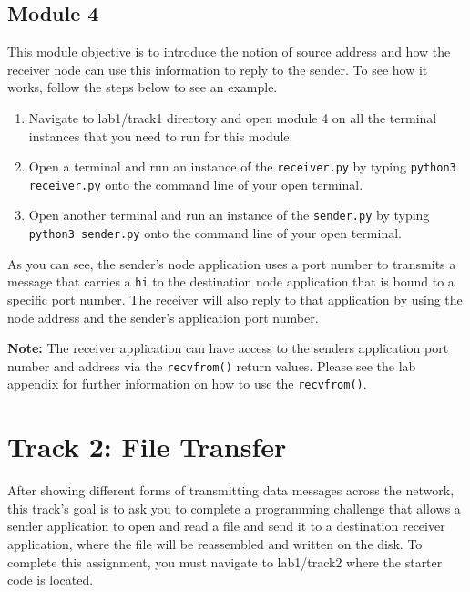 \documentclass[11pt]{article}
\begin{document}


\subsection{Module 4}
\label{subsec:module4}
This module objective is to introduce the notion of source address and how the receiver node can use this information to reply to the sender. To see how it works, follow the steps below to see an example.


\begin{enumerate}
    \item Navigate to lab1/track1 directory and open module 4 on all the terminal instances that you need to run for this module.
    \item Open a terminal and run an instance of the \texttt{receiver.py} by typing \texttt{python3 receiver.py} onto the command line of your open terminal.
    \item Open another terminal and run an instance of the \texttt{sender.py} by typing \texttt{python3 sender.py} onto the command line of your open terminal.
\end{enumerate}

As you can see, the sender's node application uses a port number to transmits a message that carries a \texttt{hi} to the destination node application that is bound to a specific port number. The receiver will also reply to that application by using the node address and the sender's application port number.

\textbf{Note:}
The receiver application can have access to the senders application port number and address via the \texttt{recvfrom()} return values. Please see the lab appendix for further information on how to use the \texttt{recvfrom()}.

\section{Track 2: File Transfer}
\label{sec:track2}
After showing different forms of transmitting data messages across the network, this track's goal is to ask you to complete a programming challenge that allows a sender application to open and read a file and send it to a destination receiver application, where the file will be reassembled and written on the disk.
To complete this assignment, you must navigate to lab1/track2 where the starter code is located.
\end{document}

